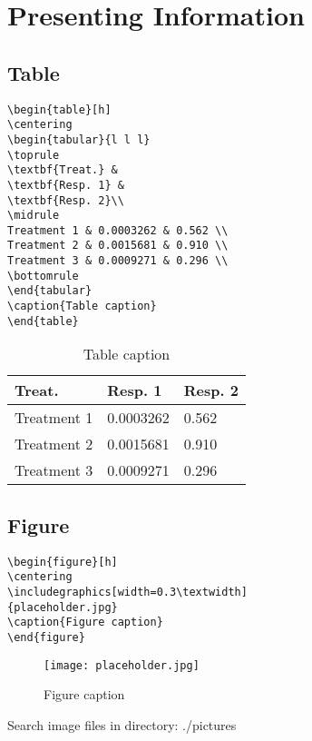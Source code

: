 \chapter{Presenting Information}

\lipsum[1] 
\section{Table}
\lipsum[1] 
\lipsum[1][1-3]
\begin{highlightbox}
\begin{verbatim}
\begin{table}[h]
\centering
\begin{tabular}{l l l}
\toprule
\textbf{Treat.} & 
\textbf{Resp. 1} & 
\textbf{Resp. 2}\\
\midrule
Treatment 1 & 0.0003262 & 0.562 \\
Treatment 2 & 0.0015681 & 0.910 \\
Treatment 3 & 0.0009271 & 0.296 \\
\bottomrule
\end{tabular}
\caption{Table caption}
\end{table}
\end{verbatim}
\end{highlightbox}
\begin{table}[h]
\centering
\begin{tabular}{l l l}
\toprule
\textbf{Treat.} & \textbf{Resp. 1} & \textbf{Resp. 2}\\
\midrule
Treatment 1 & 0.0003262 & 0.562 \\
Treatment 2 & 0.0015681 & 0.910 \\
Treatment 3 & 0.0009271 & 0.296 \\
\bottomrule
\end{tabular}
\caption{Table caption}
\end{table}

\section{Figure}

\lipsum[1] 

\begin{highlightbox}
\begin{verbatim}
\begin{figure}[h]
\centering
\includegraphics[width=0.3\textwidth]
{placeholder.jpg}
\caption{Figure caption}
\end{figure}
\end{verbatim}
\end{highlightbox}
\begin{figure}[h]
\centering\texttt{[image: placeholder.jpg]}
\caption{Figure caption}
\end{figure}

\begin{attentionbox}
Search image files in directory: ./pictures\\
\end{attentionbox}

